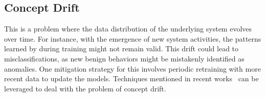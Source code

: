 \subsection{Concept Drift} This is a problem where the data distribution of the underlying system evolves over time. For instance, with the emergence of new system activities, the patterns learned by \Sys during training might not remain valid. This drift could lead to misclassifications, as new benign behaviors might be mistakenly identified as anomalies. One mitigation strategy for this involves periodic retraining with more recent data to update the models. Techniques mentioned in recent works~\cite{lu2018learning, barbero2022transcending,jordaney2017transcend} can be leveraged to deal with the problem of concept drift.




